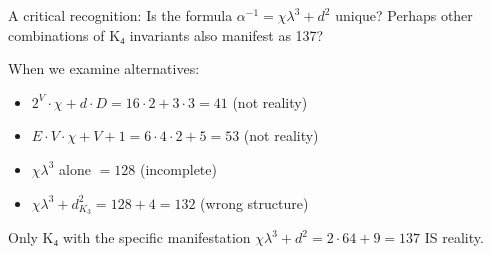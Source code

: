 \documentclass[11pt,a4paper]{book}
\begin{document}
A critical recognition: Is the formula $\alpha^{-1} = \chi \lambda^3 + d^2$ unique? Perhaps other combinations of K₄ invariants also manifest as 137?

When we examine alternatives:
\begin{itemize}
\item $2^V \cdot \chi + d \cdot D = 16 \cdot 2 + 3 \cdot 3 = 41$ \quad (not reality)
\item $E \cdot V \cdot \chi + V + 1 = 6 \cdot 4 \cdot 2 + 5 = 53$ \quad (not reality)
\item $\chi \lambda^3$ alone $= 128$ \quad (incomplete)
\item $\chi \lambda^3 + d^2_{K_3} = 128 + 4 = 132$ \quad (wrong structure)
\end{itemize}

Only K₄ with the specific manifestation $\chi \lambda^3 + d^2 = 2 \cdot 64 + 9 = 137$ IS reality.
\end{document}
